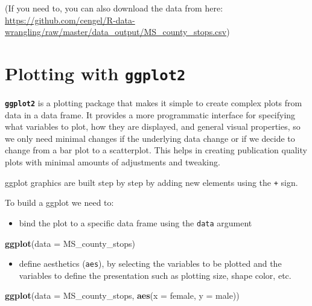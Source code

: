\documentclass[]{book}
\newenvironment{Shaded}{\begin{snugshade}}{\end{snugshade}}
\newcommand{\DataTypeTok}[1]{\textcolor[rgb]{0.13,0.29,0.53}{#1}}
\newcommand{\KeywordTok}[1]{\textcolor[rgb]{0.13,0.29,0.53}{\textbf{#1}}}
\newcommand{\NormalTok}[1]{#1}
\providecommand{\tightlist}{%
  \setlength{\itemsep}{0pt}\setlength{\parskip}{0pt}}
\begin{document}
(If you need to, you can also download the data from here: \url{https://github.com/cengel/R-data-wrangling/raw/master/data_output/MS_county_stops.csv})

\hypertarget{plotting-with-ggplot2}{%
\section{\texorpdfstring{Plotting with \textbf{\texttt{ggplot2}}}{Plotting with ggplot2}}\label{plotting-with-ggplot2}}

\textbf{\texttt{ggplot2}} is a plotting package that makes it simple to create complex plots
from data in a data frame. It provides a more programmatic interface for
specifying what variables to plot, how they are displayed, and general visual
properties, so we only need minimal changes if the underlying data change or if
we decide to change from a bar plot to a scatterplot. This helps in creating
publication quality plots with minimal amounts of adjustments and tweaking.

ggplot graphics are built step by step by adding new elements using the \texttt{+} sign.

To build a ggplot we need to:

\begin{itemize}
\tightlist
\item
  bind the plot to a specific data frame using the \texttt{data} argument
\end{itemize}

\begin{Shaded}
\begin{Highlighting}[]
\KeywordTok{ggplot}\NormalTok{(}\DataTypeTok{data =}\NormalTok{ MS_county_stops)}
\end{Highlighting}
\end{Shaded}

\begin{itemize}
\tightlist
\item
  define aesthetics (\texttt{aes}), by selecting the variables to be plotted and the variables to define the presentation such as plotting size, shape color, etc.
\end{itemize}

\begin{Shaded}
\begin{Highlighting}[]
\KeywordTok{ggplot}\NormalTok{(}\DataTypeTok{data =}\NormalTok{ MS_county_stops, }\KeywordTok{aes}\NormalTok{(}\DataTypeTok{x =}\NormalTok{ female, }\DataTypeTok{y =}\NormalTok{ male))}
\end{Highlighting}
\end{Shaded}
\end{document}
